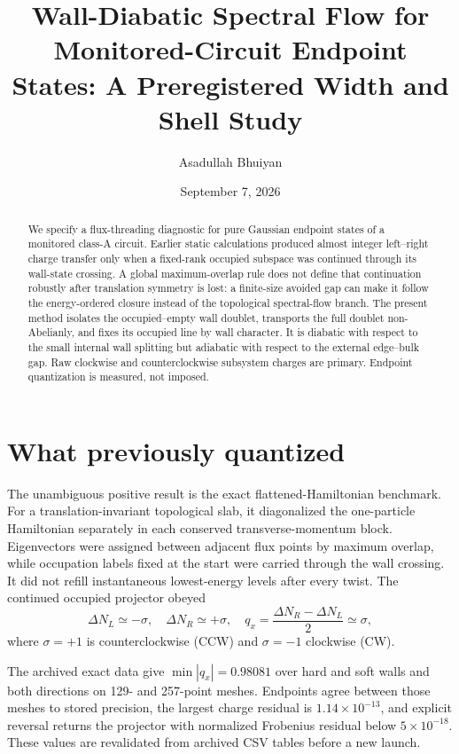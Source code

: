 \documentclass[aps,prb,twocolumn,floatfix,nofootinbib]{revtex4-2}
\begin{document}
\title{Wall-Diabatic Spectral Flow for Monitored-Circuit Endpoint States: A Preregistered Width and Shell Study}
\author{Asadullah Bhuiyan}
\date{September 7, 2026}

\begin{abstract}
We specify a flux-threading diagnostic for pure Gaussian endpoint states of a
monitored class-A circuit.  Earlier static calculations produced almost
integer left--right charge transfer only when a fixed-rank occupied subspace
was continued through its wall-state crossing.  A global maximum-overlap rule
does not define that continuation robustly after translation symmetry is
lost: a finite-size avoided gap can make it follow the energy-ordered closure
instead of the topological spectral-flow branch.  The present method isolates
the occupied--empty wall doublet, transports the full doublet non-Abelianly,
and fixes its occupied line by wall character.  It is diabatic with respect
to the small internal wall splitting but adiabatic with respect to the
external edge--bulk gap.  Raw clockwise and counterclockwise subsystem
charges are primary.  Endpoint quantization is measured, not imposed.
\end{abstract}
\maketitle

\section{What previously quantized}

The unambiguous positive result is the exact flattened-Hamiltonian benchmark.
For a translation-invariant topological slab, it diagonalized the
one-particle Hamiltonian separately in each conserved transverse-momentum
block.  Eigenvectors were assigned between adjacent flux points by maximum
overlap, while occupation labels fixed at the start were carried through the
wall crossing.  It did not refill instantaneous lowest-energy levels after
every twist.  The continued occupied projector obeyed
\begin{equation}
 \Delta N_L\simeq-\sigma,\quad \Delta N_R\simeq+\sigma,\quad
 q_x=\frac{\Delta N_R-\Delta N_L}{2}\simeq\sigma ,
 \label{eq:qx-summary}
\end{equation}
where $\sigma=+1$ is counterclockwise (CCW) and $\sigma=-1$ clockwise (CW).

The archived exact data give $\min|q_x|=0.98081$ over hard and soft walls and
both directions on 129- and 257-point meshes.  Endpoints agree between those
meshes to stored precision, the largest charge residual is
$1.14\times10^{-13}$, and explicit reversal returns the projector with
normalized Frobenius residual below $5\times10^{-18}$.  These values are
revalidated from archived CSV tables before a new launch.
\end{document}

